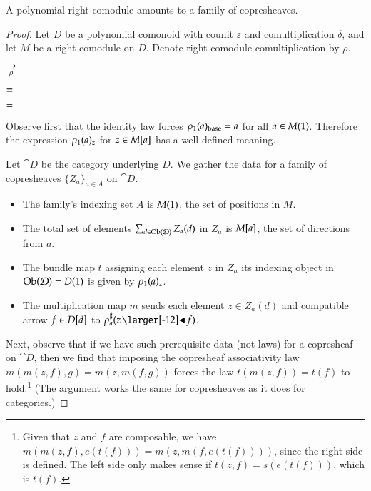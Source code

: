 \documentclass{amsart}
\begin{document}
\begin{prop}
  A polynomial right comodule amounts to a family of copresheaves.
\end{prop}
\begin{proof}
  Let $D$ be a polynomial comonoid with counit $\varepsilon$ and
  comultiplication $\delta$, and let $M$ be a right comodule on
  $D$. Denote right comodule comultiplication by $\rho$.

  \begin{center}
    
    \hspace{-.75em}
    $\underset{\rho}{\to}$
    \hspace{.5em}
    
  \end{center}

  \begin{center}
    
    $=$
    \quad
    
  \end{center}

  \begin{center}
    
    \quad
    $=$
    \quad
    
  \end{center}

  Observe first that the identity law forces ${\rho}_1(a)_{\mathrm{base}} = a$
  for all $a \in M(1)$.
  Therefore the expression ${\rho}_1(a)_z$ for $z \in M[a]$ has a
  well-defined meaning.

  Let $\cat{D}$ be the category underlying $D$. We gather the
  data for a family of copresheaves $\{Z_a\}_{a \in A}$ on $\cat{D}$.
  \begin{itemize}
  \item The family's indexing set $A$ is $M(1)$, the set
    of positions in $M$.
  \item The total set of elements $\sum_{d \in \operatorname{Ob}(\mathcal{D})}Z_a(d)$ in
    $Z_a$ is $M[a]$, the set of directions from $a$.
  \item The bundle map $t$ assigning each element $z$ in $Z_a$ its indexing
    object in $\operatorname{Ob}(\mathcal{D}) = D(1)$ is given by ${\rho}_1(a)_z$.
  \item The multiplication map $m$ sends each element $z \in Z_a(d)$ and compatible
    arrow $f \in D[d]$ to $\dirmapof{\rho}{a}{z \subd f}$.
  \end{itemize}
  
  Next, observe that if we have such prerequisite data (not laws) for
  a copresheaf on $\cat{D}$, then we find that imposing the copresheaf
  associativity law $m(m(z, f), g) = m(z, m(f, g))$ forces the law
  $t(m(z,f)) = t(f)$ to hold.\footnote{Given that $z$ and $f$ are
    composable, we have $m(m(z,f),e(t(f))) = m(z,m(f,e(t(f))))$, since
    the right side is defined. The left side only makes sense if
    $t(z,f) = s(e(t(f)))$, which is $t(f)$.} (The argument works the same
  for copresheaves as it does for categories.)


\end{proof}
\end{document}
